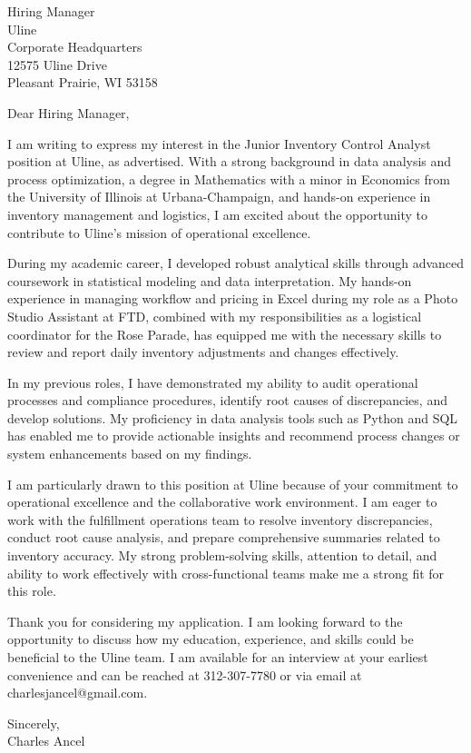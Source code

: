 \documentclass{letter}
\begin{document}
\begin{letter}{Hiring Manager\\Uline\\Corporate Headquarters\\12575 Uline Drive\\Pleasant Prairie, WI 53158}

\opening{Dear Hiring Manager,}

I am writing to express my interest in the Junior Inventory Control Analyst position at Uline, as advertised. With a strong background in data analysis and process optimization, a degree in Mathematics with a minor in Economics from the University of Illinois at Urbana-Champaign, and hands-on experience in inventory management and logistics, I am excited about the opportunity to contribute to Uline's mission of operational excellence.

During my academic career, I developed robust analytical skills through advanced coursework in statistical modeling and data interpretation. My hands-on experience in managing workflow and pricing in Excel during my role as a Photo Studio Assistant at FTD, combined with my responsibilities as a logistical coordinator for the Rose Parade, has equipped me with the necessary skills to review and report daily inventory adjustments and changes effectively.

In my previous roles, I have demonstrated my ability to audit operational processes and compliance procedures, identify root causes of discrepancies, and develop solutions. My proficiency in data analysis tools such as Python and SQL has enabled me to provide actionable insights and recommend process changes or system enhancements based on my findings.

I am particularly drawn to this position at Uline because of your commitment to operational excellence and the collaborative work environment. I am eager to work with the fulfillment operations team to resolve inventory discrepancies, conduct root cause analysis, and prepare comprehensive summaries related to inventory accuracy. My strong problem-solving skills, attention to detail, and ability to work effectively with cross-functional teams make me a strong fit for this role.

Thank you for considering my application. I am looking forward to the opportunity to discuss how my education, experience, and skills could be beneficial to the Uline team. I am available for an interview at your earliest convenience and can be reached at 312-307-7780 or via email at charlesjancel@gmail.com.

\begin{flushleft}
Sincerely,\\
Charles Ancel
\end{flushleft}

\end{letter}
\end{document}
